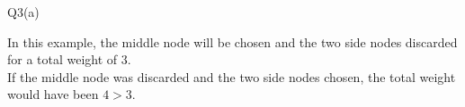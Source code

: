\begin{problem}
  {Q3(a)}
  ~\\
  \begin{center}
  \end{center}
  In this example, the middle node will be chosen and the two side nodes discarded for a total weight of $3$. \\
  If the middle node was discarded and the two side nodes chosen, the total weight would have been $4 > 3$. \\
\end{problem}
